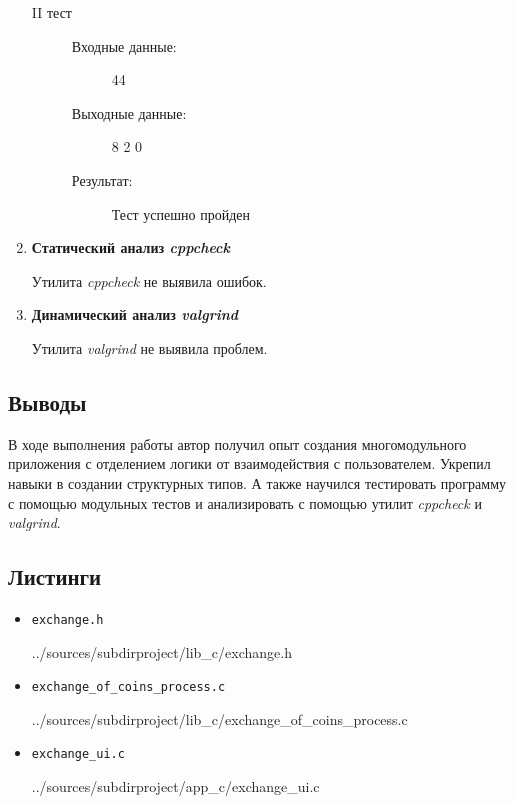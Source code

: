 \documentclass[12pt,a4paper]{report}
\begin{document}
\begin{enumerate}
\begin{description}
\item[II тест]
\hspace{\parindent}
\begin{flushleft}
\begin{description}
\item[Входные данные:] 44
\item[Выходные данные:] 8 2 0
\item[Результат:] Тест успешно пройден
\end{description}
\end{flushleft}
\end{description}

\item \textbf{Статический анализ \textit{cppcheck}}

Утилита \textit{cppcheck} не выявила ошибок.

\item \textbf{Динамический анализ \textit{valgrind}}

Утилита \textit{valgrind} не выявила проблем.
\end{enumerate}
\subsection{Выводы}
\hspace{\parindent}
В ходе выполнения работы автор получил опыт создания многомодульного приложения с отделением логики от взаимодействия с пользователем. Укрепил навыки в создании структурных типов. А также научился тестировать программу с помощью модульных тестов и анализировать с помощью утилит \textit{cppcheck} и \textit{valgrind}.
\subsection*{Листинги}
\begin{itemize}
\item[] \verb-exchange.h-

{../sources/subdirproject/lib_c/exchange.h}
\item[] \verb-exchange_of_coins_process.c-

{../sources/subdirproject/lib_c/exchange_of_coins_process.c}
\item[] \verb-exchange_ui.c-

{../sources/subdirproject/app_c/exchange_ui.c}
\end{itemize}

%
\end{document}
